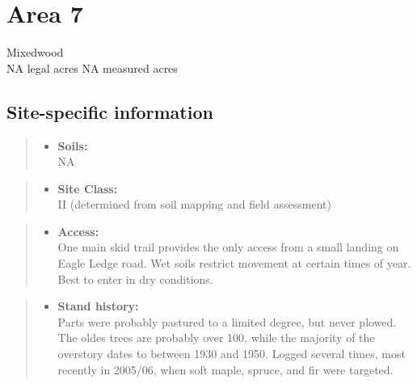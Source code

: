\documentclass[]{tufte-handout}
\providecommand{\tightlist}{%
  \setlength{\itemsep}{0pt}\setlength{\parskip}{0pt}}
\begin{document}
\section{Area 7}\label{area-7}

Mixedwood\\
\noindent NA legal acres \textbar{} NA measured acres

\subsection{Site-specific
information}\label{site-specific-information-6}

\begin{quote}
\begin{itemize}
\tightlist
\item
  \textbf{Soils:}\\
  \indent\indent  NA
\end{itemize}
\end{quote}

\begin{quote}
\begin{itemize}
\tightlist
\item
  \textbf{Site Class:}\\
  \vspace{2pt} II (determined from soil mapping and field assessment)
\end{itemize}
\end{quote}

\begin{quote}
\begin{itemize}
\tightlist
\item
  \textbf{Access:}\\
  \vspace{2pt} One main skid trail provides the only access from a small
  landing on Eagle Ledge road. Wet soils restrict movement at certain
  times of year. Best to enter in dry conditions.
\end{itemize}
\end{quote}

\begin{quote}
\begin{itemize}
\tightlist
\item
  \textbf{Stand history:}\\
  \vspace{2pt} Parts were probably pastured to a limited degree, but
  never plowed. The oldes trees are probably over 100, while the
  majority of the overstory dates to between 1930 and 1950. Logged
  several times, most recently in 2005/06, when soft maple, spruce, and
  fir were targeted.
\end{itemize}
\end{quote}
\end{document}
